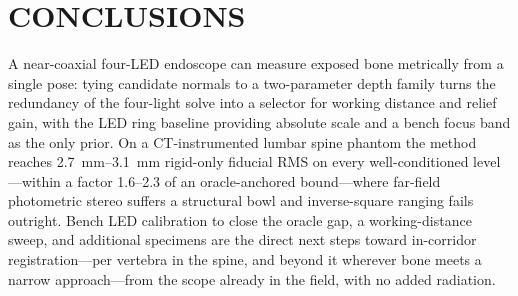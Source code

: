 \documentclass[conference]{IEEEtran}
\begin{document}
\section{CONCLUSIONS}
A near-coaxial four-LED endoscope can measure exposed bone metrically
from a single pose: tying candidate normals to a two-parameter depth
family turns the redundancy of the four-light solve into a selector for
working distance and relief gain, with the LED ring baseline providing
absolute scale and a bench focus band as the only prior.  On a
CT-instrumented lumbar spine phantom the method reaches
\SIrange{2.7}{3.1}{\milli\meter} rigid-only fiducial RMS on every
well-conditioned level---within a factor 1.6--2.3 of an oracle-anchored
bound---where far-field photometric stereo suffers a structural bowl and
inverse-square ranging fails outright.  Bench LED calibration to close
the oracle gap, a working-distance sweep, and additional specimens are
the direct next steps toward in-corridor registration---per vertebra in
the spine, and beyond it wherever bone meets a narrow approach---from
the scope already in the field, with no added radiation.



\end{document}
